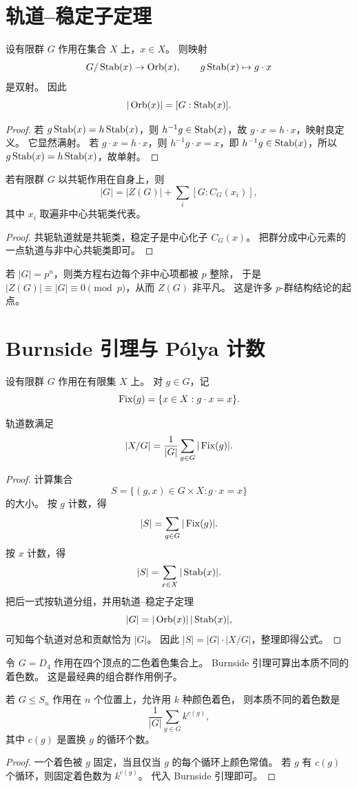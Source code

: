 \section{轨道--稳定子定理}
\begin{theorem}[轨道--稳定子]
设有限群 $G$ 作用在集合 $X$ 上，$x\in X$。
则映射
\[
G/\operatorname{Stab}(x)\to \operatorname{Orb}(x),\qquad g\operatorname{Stab}(x)\mapsto g\cdot x
\]
是双射。
因此
\[
|\operatorname{Orb}(x)|=[G:\operatorname{Stab}(x)].
\]
\end{theorem}
\begin{proof}
若 $g\operatorname{Stab}(x)=h\operatorname{Stab}(x)$，则 $h^{-1}g\in\operatorname{Stab}(x)$，故 $g\cdot x=h\cdot x$，映射良定义。
它显然满射。
若 $g\cdot x=h\cdot x$，则 $h^{-1}g\cdot x=x$，即 $h^{-1}g\in\operatorname{Stab}(x)$，所以 $g\operatorname{Stab}(x)=h\operatorname{Stab}(x)$，故单射。
\end{proof}
\begin{corollary}[类方程]
若有限群 $G$ 以共轭作用在自身上，则
\[
|G|=|Z(G)|+\sum_i [G:C_G(x_i)],
\]
其中 $x_i$ 取遍非中心共轭类代表。
\end{corollary}
\begin{proof}
共轭轨道就是共轭类，稳定子是中心化子 $C_G(x)$。
把群分成中心元素的一点轨道与非中心共轭类即可。
\end{proof}
\begin{example}[有限 $p$-群中心非平凡]
若 $|G|=p^n$，则类方程右边每个非中心项都被 $p$ 整除，
于是 $|Z(G)|\equiv |G|\equiv0\pmod p$，从而 $Z(G)$ 非平凡。
这是许多 $p$-群结构结论的起点。
\end{example}
\section{Burnside 引理与 P\'olya 计数}
\begin{definition}
设有限群 $G$ 作用在有限集 $X$ 上。
对 $g\in G$，记
\[
\operatorname{Fix}(g)=\{x\in X:g\cdot x=x\}.
\]
\end{definition}
\begin{theorem}[Burnside 引理]
轨道数满足
\[
|X/G|=\frac{1}{|G|}\sum_{g\in G}|\operatorname{Fix}(g)|.
\]
\end{theorem}
\begin{proof}
计算集合
\[
S=\{(g,x)\in G\times X:g\cdot x=x\}
\]
的大小。
按 $g$ 计数，得
\[
|S|=\sum_{g\in G}|\operatorname{Fix}(g)|.
\]
按 $x$ 计数，得
\[
|S|=\sum_{x\in X}|\operatorname{Stab}(x)|.
\]
把后一式按轨道分组，并用轨道--稳定子定理
\[
|G|=|\operatorname{Orb}(x)|\,|\operatorname{Stab}(x)|,
\]
可知每个轨道对总和贡献恰为 $|G|$。
因此 $|S|=|G|\cdot |X/G|$，整理即得公式。
\end{proof}
\begin{example}[给正方形顶点着色]
令 $G=D_4$ 作用在四个顶点的二色着色集合上。
Burnside 引理可算出本质不同的着色数。
这是最经典的组合群作用例子。
\end{example}
\begin{proposition}
若 $G\le S_n$ 作用在 $n$ 个位置上，允许用 $k$ 种颜色着色，
则本质不同的着色数是
\[
\frac{1}{|G|}\sum_{g\in G}k^{c(g)},
\]
其中 $c(g)$ 是置换 $g$ 的循环个数。
\end{proposition}
\begin{proof}
一个着色被 $g$ 固定，当且仅当 $g$ 的每个循环上颜色常值。
若 $g$ 有 $c(g)$ 个循环，则固定着色数为 $k^{c(g)}$。
代入 Burnside 引理即可。
\end{proof}
